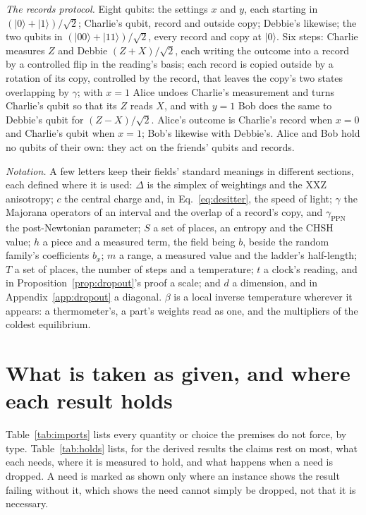 \documentclass[aps,prd,reprint,superscriptaddress]{revtex4-2}
\begin{document}
\textit{The records protocol.} Eight qubits: the settings $x$ and $y$, each starting in $(|0\rangle + |1\rangle)/\sqrt 2$; Charlie's qubit, record and outside copy; Debbie's likewise; the two qubits in $(|00\rangle + |11\rangle)/\sqrt 2$, every record and copy at $|0\rangle$. Six steps: Charlie measures $Z$ and Debbie $(Z + X)/\sqrt 2$, each writing the outcome into a record by a controlled flip in the reading's basis; each record is copied outside by a rotation of its copy, controlled by the record, that leaves the copy's two states overlapping by $\gamma$; with $x = 1$ Alice undoes Charlie's measurement and turns Charlie's qubit so that its $Z$ reads $X$, and with $y = 1$ Bob does the same to Debbie's qubit for $(Z - X)/\sqrt 2$. Alice's outcome is Charlie's record when $x = 0$ and Charlie's qubit when $x = 1$; Bob's likewise with Debbie's. Alice and Bob hold no qubits of their own: they act on the friends' qubits and records.

\textit{Notation.} A few letters keep their fields' standard meanings in different sections, each defined where it is used: $\Delta$ is the simplex of weightings and the XXZ anisotropy; $c$ the central charge and, in Eq.~\eqref{eq:desitter}, the speed of light; $\gamma$ the Majorana operators of an interval and the overlap of a record's copy, and $\gamma_{\mathrm{PPN}}$ the post-Newtonian parameter; $S$ a set of places, an entropy and the CHSH value; $h$ a piece and a measured term, the field being $b$, beside the random family's coefficients $b_x$; $m$ a range, a measured value and the ladder's half-length; $T$ a set of places, the number of steps and a temperature; $t$ a clock's reading, and in Proposition~\ref{prop:dropout}'s proof a scale; and $d$ a dimension, and in Appendix~\ref{app:dropout} a diagonal. $\beta$ is a local inverse temperature wherever it appears: a thermometer's, a part's weights read as one, and the multipliers of the coldest equilibrium.

\section{What is taken as given, and where each result holds}
\label{app:scope}

Table~\ref{tab:imports} lists every quantity or choice the premises do not force, by type. Table~\ref{tab:holds} lists, for the derived results the claims rest on most, what each needs, where it is measured to hold, and what happens when a need is dropped. A need is marked as shown only where an instance shows the result failing without it, which shows the need cannot simply be dropped, not that it is necessary.
\end{document}
